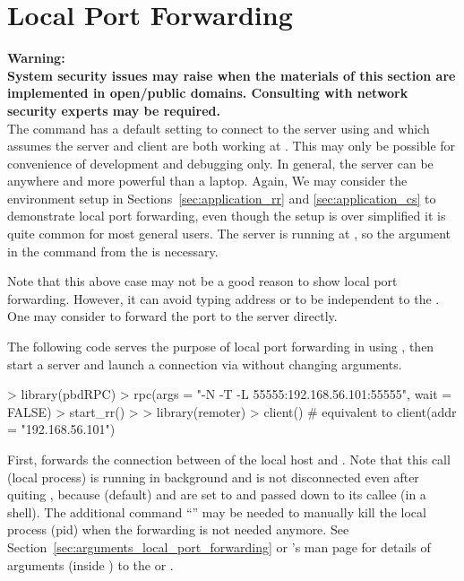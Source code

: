 \section[Local Port Forwarding]{Local Port Forwarding}
\label{sec:local_port_forwarding}

{\color{red} \bf Warning:\\
System security issues may raise when the materials of this section are
implemented in open/public domains. Consulting with network security experts
may be required.
}
\\

The  command  has a default setting
to connect to the  server using  and
 which assumes the  server and client are
both working at .
This may only be possible for convenience of development and debugging only.
In general, the server can be anywhere and more powerful than a laptop.
Again, We may consider the environment setup in
Sections~\ref{sec:application_rr} and \ref{sec:application_cs} to
demonstrate local port forwarding, even though the setup is over simplified
it is quite common for most general users.
The server is running at , so the argument
 in the 
command  from the 
is necessary.

Note that this above case may not be a good reason to show local port
forwarding.
However, it can avoid typing address or to be independent to the .
One may consider to forward the  port  to the
server directly.

The following code serves the purpose of local port forwarding in
 using , then start a  server and
launch a connection via  without changing arguments.
\begin{Code}[title=Forward \code{localhost:55555} to \code{192.168.56.101:55555}]
> library(pbdRPC)
> rpc(args = "-N -T -L 55555:192.168.56.101:55555", wait = FALSE)
> start_rr()
>
> library(remoter)
> client()    # equivalent to client(addr = "192.168.56.101")
\end{Code}

First, 
forwards the connection between  of the local host and
.
Note that this call (local process) is running in background and is
not disconnected even after quiting ,
because  (default) and {\color{red} }
are set to  and passed down to its callee (in a shell).
{\color{red}
The additional command ``'' may be needed to manually
kill the local process (pid) when the forwarding is not needed anymore.
}
See Section~\ref{sec:arguments_local_port_forwarding} or
's man page for details of arguments 
(inside ) to the  or .

